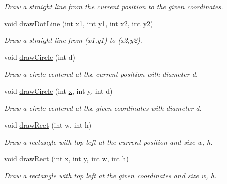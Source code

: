 \begin{DoxyCompactItemize}
\begin{DoxyCompactList}\small\item\em Draw a straight line from the current position to the given coordinates. \end{DoxyCompactList}\item 
\hypertarget{classGUI_1_1Drawable_aeb00abd40b47c65ae78ec16166f3597f}{void \hyperlink{classGUI_1_1Drawable_aeb00abd40b47c65ae78ec16166f3597f}{draw\-Dot\-Line} (int x1, int y1, int x2, int y2)}\label{classGUI_1_1Drawable_aeb00abd40b47c65ae78ec16166f3597f}

\begin{DoxyCompactList}\small\item\em Draw a straight line from ({\ttfamily x1},{\ttfamily y1}) to ({\ttfamily x2},{\ttfamily y2}). \end{DoxyCompactList}\item 
void \hyperlink{classGUI_1_1Drawable_afcec69b9023bab1ea5267b5bfbc7a0ec}{draw\-Circle} (int d)
\begin{DoxyCompactList}\small\item\em Draw a circle centered at the current position with diameter {\ttfamily d}. \end{DoxyCompactList}\item 
void \hyperlink{classGUI_1_1Drawable_add0650ef9d31fa54a378856ceec2bb72}{draw\-Circle} (int \hyperlink{classGUI_1_1Drawable_a098294925bd310aa41080a2441790b80}{x}, int \hyperlink{classGUI_1_1Drawable_a574c99954cc268937f2c66ebe1332316}{y}, int d)
\begin{DoxyCompactList}\small\item\em Draw a circle centered at the given coordinates with diameter {\ttfamily d}. \end{DoxyCompactList}\item 
void \hyperlink{classGUI_1_1Drawable_a58a078deebc5a6dc55fd249268ea9f89}{draw\-Rect} (int w, int h)
\begin{DoxyCompactList}\small\item\em Draw a rectangle with top left at the current position and size {\ttfamily w}, {\ttfamily h}. \end{DoxyCompactList}\item 
void \hyperlink{classGUI_1_1Drawable_aeee95c349ff9948da7470458db11ee3c}{draw\-Rect} (int \hyperlink{classGUI_1_1Drawable_a098294925bd310aa41080a2441790b80}{x}, int \hyperlink{classGUI_1_1Drawable_a574c99954cc268937f2c66ebe1332316}{y}, int w, int h)
\begin{DoxyCompactList}\small\item\em Draw a rectangle with top left at the given coordinates and size {\ttfamily w}, {\ttfamily h}. \end{DoxyCompactList}\item 

\end{DoxyCompactItemize}
